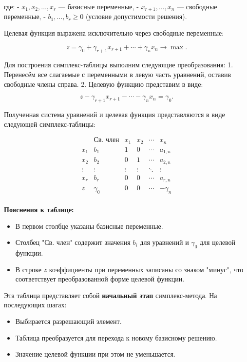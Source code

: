 \documentclass{report}
\begin{document}
	где:
	- \(x_{1}, x_{2}, \ldots, x_{r}\) — базисные переменные,
	- \(x_{r+1}, \ldots, x_{n}\) — свободные переменные,
	- \(b_{1}, \ldots, b_{r} \geq 0\) (условие допустимости решения).
	
	Целевая функция выражена исключительно через свободные переменные:
	
	\[
	z = \gamma_{0} + \gamma_{r+1}x_{r+1} + \cdots + \gamma_{n}x_{n} \to \max.
	\]
	
	Для построения симплекс-таблицы выполним следующие преобразования:
	1. Перенесём все слагаемые с переменными в левую часть уравнений, оставив свободные члены справа.
	2. Целевую функцию представим в виде:
	
	\[
	z - \gamma_{r+1}x_{r+1} - \cdots - \gamma_{n}x_{n} = \gamma_{0}.
	\]
	
	Полученная система уравнений и целевая функция представляются в виде следующей симплекс-таблицы:
	
	\[
	\begin{array}{c|ccccc}
		& \text{Св. член} & x_{1} & x_{2} & \cdots & x_{n} \\
		\hline
		x_{1} & b_{1} & 1 & 0 & \cdots & a_{1,n} \\
		x_{2} & b_{2} & 0 & 1 & \cdots & a_{2,n} \\
		\vdots & \vdots & \vdots & \vdots & \ddots & \vdots \\
		x_{r} & b_{r} & 0 & 0 & \cdots & a_{r,n} \\
		\hline
		z & \gamma_{0} & 0 & 0 & \cdots & -\gamma_{n} \\
	\end{array}
	\]
	
	\textbf{Пояснения к таблице:}
	\begin{itemize}
		\item В первом столбце указаны базисные переменные.
		\item Столбец "Св. член" содержит значения \(b_{i}\) для уравнений и \(\gamma_{0}\) для целевой функции.
		\item В строке \(z\) коэффициенты при переменных записаны со знаком "минус", что соответствует преобразованной форме целевой функции.
	\end{itemize}
	
	Эта таблица представляет собой \textbf{начальный этап} симплекс-метода. На последующих шагах:
	\begin{itemize}
		\item Выбирается разрешающий элемент.
		\item Таблица преобразуется для перехода к новому базисному решению.
		\item Значение целевой функции при этом не уменьшается.
	\end{itemize}
	
\end{document}
